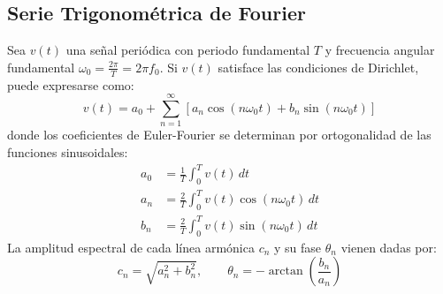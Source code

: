 \documentclass[11pt,a4paper]{article}
\begin{document}
\subsection{Serie Trigonométrica de Fourier}
Sea $v(t)$ una señal periódica con periodo fundamental $T$ y frecuencia angular fundamental $\omega_0 = \frac{2\pi}{T} = 2\pi f_0$. Si $v(t)$ satisface las condiciones de Dirichlet, puede expresarse como:
\begin{equation}
    v(t) = a_0 + \sum_{n=1}^\infty \left[ a_n \cos(n\omega_0 t) + b_n \sin(n\omega_0 t) \right]
    \label{eq:fourier_trig}
\end{equation}
donde los coeficientes de Euler-Fourier se determinan por ortogonalidad de las funciones sinusoidales:
\begin{align}
    a_0 &= \frac{1}{T} \int_0^T v(t)\, dt \label{eq:a0_def}\\
    a_n &= \frac{2}{T} \int_0^T v(t) \cos(n\omega_0 t)\, dt \label{eq:an_def}\\
    b_n &= \frac{2}{T} \int_0^T v(t) \sin(n\omega_0 t)\, dt \label{eq:bn_def}
\end{align}
La amplitud espectral de cada línea armónica $c_n$ y su fase $\theta_n$ vienen dadas por:
\begin{equation}
    c_n = \sqrt{a_n^2 + b_n^2}, \qquad \theta_n = -\arctan\left(\frac{b_n}{a_n}\right)
\end{equation}
\end{document}
